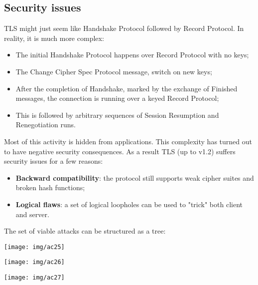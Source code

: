 \documentclass[a4paper, 10pt, titlepage]{article}
\begin{document}
\subsection{Security issues}
TLS might just seem like Handshake Protocol followed by Record Protocol. In reality, it is much more complex:
\begin{itemize}
\item The initial Handshake Protocol happens over Record Protocol with no keys;
\item The Change Cipher Spec Protocol message, switch on new keys;
\item After the completion of Handshake, marked by the exchange of Finished messages, the connection is running over a keyed Record Protocol;
\item This is followed by arbitrary sequences of Session Resumption and Renegotiation runs.
\end{itemize}
Most of this activity is hidden from applications. This complexity has turned out to have negative security consequences. As a result TLS (up to v1.2) suffers security issues for a few reasons:
\begin{itemize}
\item \textbf{Backward compatibility}: the protocol still supports weak cipher suites and broken hash functions;
\item \textbf{Logical flaws}: a set of logical loopholes can be used to "trick" both client and server.
\end{itemize}
The set of viable attacks can be structured as a tree:
\begin{center}
\texttt{[image: img/ac25]}
\end{center}
\begin{minipage}{0.7\textwidth}
\texttt{[image: img/ac26]}
\end{minipage}
\begin{minipage}{0.25\textwidth}
\texttt{[image: img/ac27]}
\end{minipage}
\end{document}
